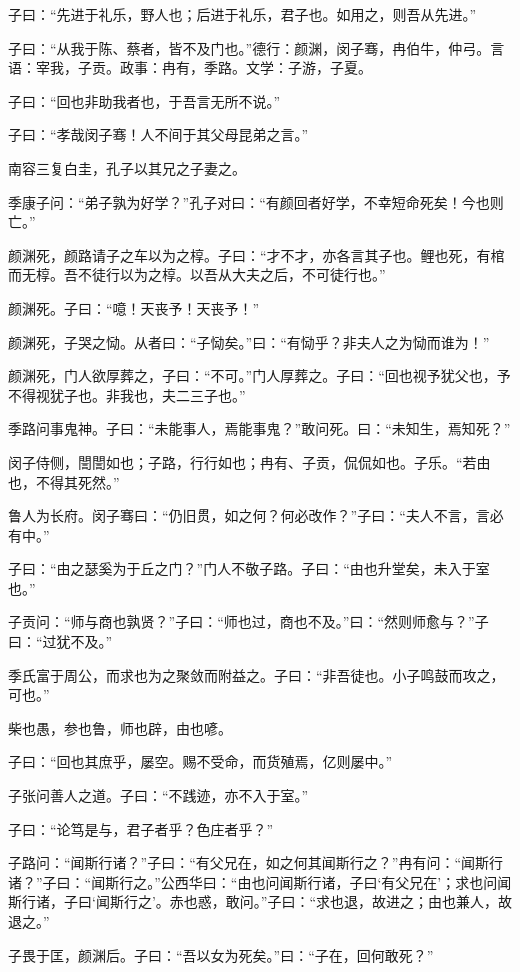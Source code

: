 \documentclass[twoside,openany]{book}
\begin{document}
子曰：“先进于礼乐，野人也；后进于礼乐，君子也。如用之，则吾从先进。” 

子曰：“从我于陈、蔡者，皆不及门也。”德行：颜渊，闵子骞，冉伯牛，仲弓。言语：宰我，子贡。政事：冉有，季路。文学：子游，子夏。 

子曰：“回也非助我者也，于吾言无所不说。” 

子曰：“孝哉闵子骞！人不间于其父母昆弟之言。” 

南容三复白圭，孔子以其兄之子妻之。 

季康子问：“弟子孰为好学？”孔子对曰：“有颜回者好学，不幸短命死矣！今也则亡。” 

颜渊死，颜路请子之车以为之椁。子曰：“才不才，亦各言其子也。鲤也死，有棺而无椁。吾不徒行以为之椁。以吾从大夫之后，不可徒行也。” 

颜渊死。子曰：“噫！天丧予！天丧予！” 

颜渊死，子哭之恸。从者曰：“子恸矣。”曰：“有恸乎？非夫人之为恸而谁为！” 

颜渊死，门人欲厚葬之，子曰：“不可。”门人厚葬之。子曰：“回也视予犹父也，予不得视犹子也。非我也，夫二三子也。” 

季路问事鬼神。子曰：“未能事人，焉能事鬼？”敢问死。曰：“未知生，焉知死？” 

闵子侍侧，誾誾如也；子路，行行如也；冉有、子贡，侃侃如也。子乐。“若由也，不得其死然。” 

鲁人为长府。闵子骞曰：“仍旧贯，如之何？何必改作？”子曰：“夫人不言，言必有中。” 

子曰：“由之瑟奚为于丘之门？”门人不敬子路。子曰：“由也升堂矣，未入于室也。” 

子贡问：“师与商也孰贤？”子曰：“师也过，商也不及。”曰：“然则师愈与？”子曰：“过犹不及。” 

季氏富于周公，而求也为之聚敛而附益之。子曰：“非吾徒也。小子鸣鼓而攻之，可也。” 

柴也愚，参也鲁，师也辟，由也喭。 

子曰：“回也其庶乎，屡空。赐不受命，而货殖焉，亿则屡中。” 

子张问善人之道。子曰：“不践迹，亦不入于室。” 

子曰：“论笃是与，君子者乎？色庄者乎？” 

子路问：“闻斯行诸？”子曰：“有父兄在，如之何其闻斯行之？”冉有问：“闻斯行诸？”子曰：“闻斯行之。”公西华曰：“由也问闻斯行诸，子曰‘有父兄在’；求也问闻斯行诸，子曰‘闻斯行之’。赤也惑，敢问。”子曰：“求也退，故进之；由也兼人，故退之。” 

子畏于匡，颜渊后。子曰：“吾以女为死矣。”曰：“子在，回何敢死？” 
\end{document}
